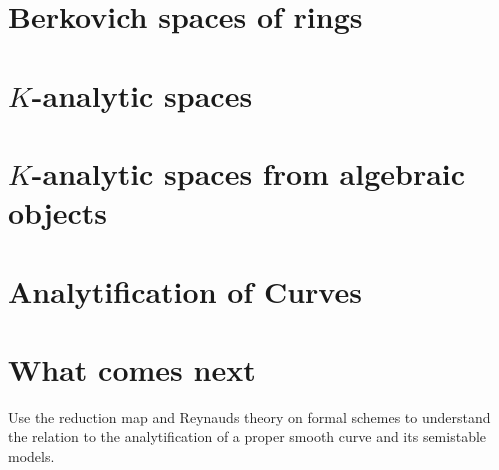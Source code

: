 \documentclass[a4paper]{article}
\begin{document}


\section{Berkovich spaces of rings} \label{sec:berkovich_spaces}



\section{$K$-analytic spaces} \label{sec:K_analytic_spaces}



\section{$K$-analytic spaces from algebraic objects} \label{sec:berkovich_analytification_of_schemes}



\section{Analytification of Curves} \label{sec:analytification_of_curves}



\section{What comes next} \label{sec:what_comes_next}

Use the reduction map and Reynauds theory on formal schemes to understand the relation to the analytification of a proper smooth curve and its semistable models. 

\printbibliography
\end{document}

